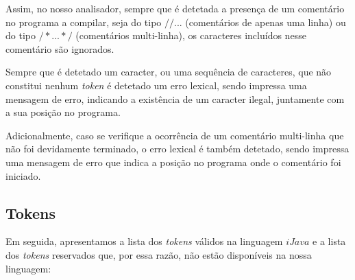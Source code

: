 \documentclass[11pt,a4paper]{article}
\begin{document}
Assim, no nosso analisador, sempre que é detetada a presença de um comentário no programa a compilar, seja do tipo $// ...$ (comentários de apenas uma linha) ou do tipo $/* ... */$ (comentários multi-linha), os caracteres incluídos nesse comentário são ignorados.

Sempre que é detetado um caracter, ou uma sequência de caracteres, que não constitui nenhum \emph{token} é detetado um erro lexical, sendo impressa uma mensagem de erro, indicando a existência de um caracter ilegal, juntamente com a sua posição no programa.

Adicionalmente, caso se verifique a ocorrência de um comentário multi-linha que não foi devidamente terminado, o erro lexical é também detetado, sendo impressa uma mensagem de erro que indica a posição no programa onde o comentário foi iniciado.

	\subsection{Tokens}

	Em seguida, apresentamos a lista dos \emph{tokens} válidos na linguagem $iJava$ e a lista dos \emph{tokens} reservados que, por essa razão, não estão disponíveis na nossa linguagem:
	
\end{document}
